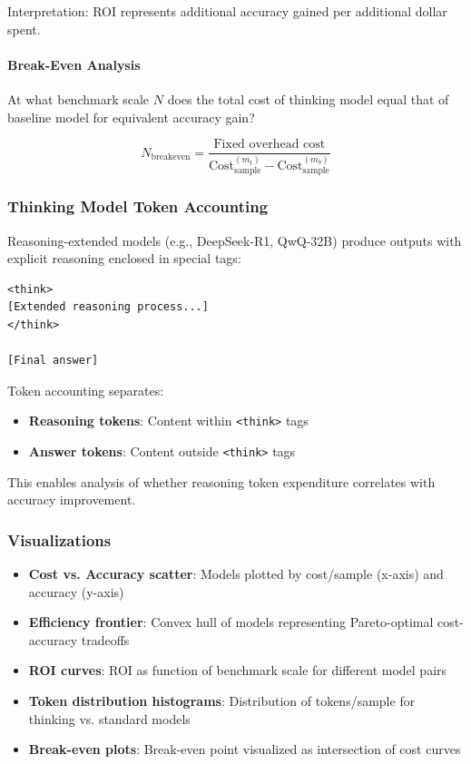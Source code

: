 Interpretation: ROI represents additional accuracy gained per additional dollar spent.

\paragraph{Break-Even Analysis}
At what benchmark scale $N$ does the total cost of thinking model equal that of baseline model for equivalent accuracy gain?

\begin{equation}
N_{\text{breakeven}} = \frac{\text{Fixed overhead cost}}{\text{Cost}_{\text{sample}}^{(m_t)} - \text{Cost}_{\text{sample}}^{(m_b)}}
\end{equation}

\subsubsection{Thinking Model Token Accounting}

Reasoning-extended models (e.g., DeepSeek-R1, QwQ-32B) produce outputs with explicit reasoning enclosed in special tags:
\begin{verbatim}
<think>
[Extended reasoning process...]
</think>

[Final answer]
\end{verbatim}

Token accounting separates:
\begin{itemize}
    \item \textbf{Reasoning tokens}: Content within \texttt{<think>} tags
    \item \textbf{Answer tokens}: Content outside \texttt{<think>} tags
\end{itemize}

This enables analysis of whether reasoning token expenditure correlates with accuracy improvement.

\subsubsection{Visualizations}

\begin{itemize}
    \item \textbf{Cost vs. Accuracy scatter}: Models plotted by cost/sample (x-axis) and accuracy (y-axis)
    \item \textbf{Efficiency frontier}: Convex hull of models representing Pareto-optimal cost-accuracy tradeoffs
    \item \textbf{ROI curves}: ROI as function of benchmark scale for different model pairs
    \item \textbf{Token distribution histograms}: Distribution of tokens/sample for thinking vs. standard models
    \item \textbf{Break-even plots}: Break-even point visualized as intersection of cost curves
\end{itemize}

